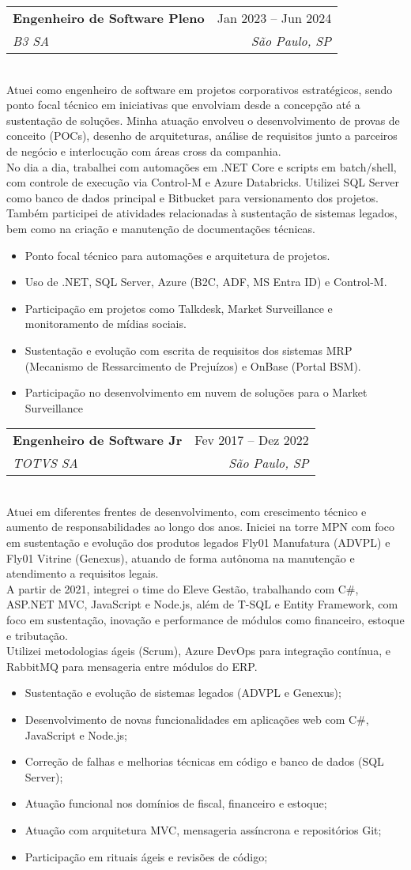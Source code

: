 \documentclass[letterpaper,11pt]{article}
\makeatletter
\newcommand{\resumeItem}[1]{
  \item\small{
    {#1 \vspace{-2pt}}
  }
}
\newcommand{\resumeSubheading}[4]{
  \vspace{-2pt}\item
    \begin{tabular*}{0.97\textwidth}[t]{l@{\extracolsep{\fill}}r}
      \textbf{#1} & #2 \\
      \textit{\small#3} & \textit{\small #4} \\
    \end{tabular*}\vspace{-7pt}
}
\newcommand{\resumeItemListStart}{\begin{itemize}}
\newcommand{\resumeItemListEnd}{\end{itemize}\vspace{-5pt}}
\makeatother
\begin{document}
    \resumeSubheading
      {Engenheiro de Software Pleno}{Jan 2023 -- Jun 2024}
      {B3 SA}{São Paulo, SP}
      \\[8pt]
      \justifying
      Atuei como engenheiro de software em projetos corporativos estratégicos, sendo ponto focal técnico em iniciativas que envolviam desde a concepção até a sustentação de soluções. Minha atuação envolveu o desenvolvimento de provas de conceito (POCs), desenho de arquiteturas, análise de requisitos junto a parceiros de negócio e interlocução com áreas cross da companhia. \\
      \justifying
      No dia a dia, trabalhei com automações em .NET Core e scripts em batch/shell, com controle de execução via Control-M e Azure Databricks. Utilizei SQL Server como banco de dados principal e Bitbucket para versionamento dos projetos. Também participei de atividades relacionadas à sustentação de sistemas legados, bem como na criação e manutenção de documentações técnicas.
      \resumeItemListStart
        \resumeItem{Ponto focal técnico para automações e arquitetura de projetos.}
        \resumeItem{Uso de .NET, SQL Server, Azure (B2C, ADF, MS Entra ID) e Control-M.}
        \resumeItem{Participação em projetos como Talkdesk, Market Surveillance e monitoramento de mídias sociais.}
        \resumeItem{Sustentação e evolução com escrita de requisitos dos sistemas MRP (Mecanismo de Ressarcimento de Prejuízos) e OnBase (Portal BSM).}
        \resumeItem{Participação no desenvolvimento em nuvem de soluções para o Market Surveillance}
      \resumeItemListEnd

    \resumeSubheading
      {Engenheiro de Software Jr}{Fev 2017 -- Dez 2022}
      {TOTVS SA}{São Paulo, SP}
      \\[8pt]
      \justifying
      Atuei em diferentes frentes de desenvolvimento, com crescimento técnico e aumento de responsabilidades ao longo dos anos. Iniciei na torre MPN com foco em sustentação e evolução dos produtos legados Fly01 Manufatura (ADVPL) e Fly01 Vitrine (Genexus), atuando de forma autônoma na manutenção e atendimento a requisitos legais. \\
      \justifying
      A partir de 2021, integrei o time do Eleve Gestão, trabalhando com C\#, ASP.NET MVC, JavaScript e Node.js, além de T-SQL e Entity Framework, com foco em sustentação, inovação e performance de módulos como financeiro, estoque e tributação. \\
      \justifying
      Utilizei metodologias ágeis (Scrum), Azure DevOps para integração contínua, e RabbitMQ para mensageria entre módulos do ERP.
      \resumeItemListStart
        \resumeItem{Sustentação e evolução de sistemas legados (ADVPL e Genexus);}
        \resumeItem{Desenvolvimento de novas funcionalidades em aplicações web com C\#, JavaScript e Node.js;}
        \resumeItem{Correção de falhas e melhorias técnicas em código e banco de dados (SQL Server);}
        \resumeItem{Atuação funcional nos domínios de fiscal, financeiro e estoque;}
        \resumeItem{Atuação com arquitetura MVC, mensageria assíncrona e repositórios Git;}
        \resumeItem{Participação em rituais ágeis e revisões de código;}
      \resumeItemListEnd
\end{document}

